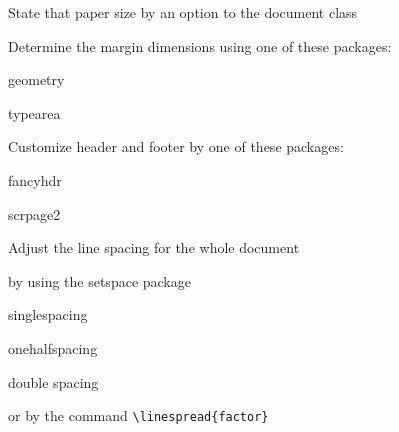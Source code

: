 \documentclass{article}
\begin{document}
	\begin{compactenum}
	\item State that paper size by an option to the document class
	\item Determine the margin dimensions using one of these packages:
	\begin{compactitem}
  \item geometry
	\item typearea
  \end{compactitem}
 \item Customize header and footer by one of these packages:
\begin{compactitem}
  \item fancyhdr
	\item scrpage2
  \end{compactitem}
\item Adjust the line spacing for the whole document
\begin{compactitem}
  \item by using the setspace package
   \begin{asparaenum}
	  	\item singlespacing
			\item onehalfspacing
			\item double spacing 
		\end{asparaenum}

	\item or by the command \verb|\linespread{factor}|
  \end{compactitem}
  \end{compactenum}
\end{document}
